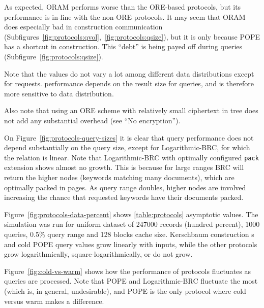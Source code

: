 			As expected, ORAM performs worse than the ORE-based protocols, but its performance is in-line with the non-ORE protocols.
			It may seem that ORAM does especially bad in construction communication (Subfigures~\ref{fig:protocols:qvol},~\ref{fig:protocols:qsize}), but it is only because POPE has a shortcut in construction.
			This ``debt'' is being payed off during queries (Subfigure~\ref{fig:protocols:qsize}).

			Note that the values do not vary a lot among different data distributions except for {\IO} requests.
			{\IO} performance depends on the result size for queries, and is therefore more sensitive to data distribution.

			Also note that using an ORE scheme with relatively small ciphertext in {\BPlus} tree does not add any substantial {\IO} overhead (see ``No encryption'').

			On Figure~\ref{fig:protocols-query-sizes} it is clear that query performance does not depend substantially on the query size, except for Logarithmic\hyp{}BRC, for which the relation is linear.
			Note that Logarithmic\hyp{}BRC with optimally configured \texttt{pack} extension shows almost no growth.
			This is because for large ranges BRC will return the higher nodes (keywords matching many documents), which are optimally packed in {\IO} pages.
			As query range doubles, higher nodes are involved increasing the chance that requested keywords have their documents packed.

			

			Figure~\ref{fig:protocols-data-percent} shows \cref{table:protocols} asymptotic values.
			The simulation was run for uniform dataset of 247000 records (hundred percent), 1000 queries, 0.5\% query range and 128 blocks cache size.
			Kerschbaum construction {\IO}s and cold POPE query values grow linearly with inputs, while the other protocols grow logarithmically, square-logarithmically, or do not grow.

			Figure~\ref{fig:cold-vs-warm} shows how the performance of protocols fluctuates as queries are processed.
			Note that POPE and Logarithmic\hyp{}BRC fluctuate the most (which is, in general, undesirable), and POPE is the only protocol where cold versus warm makes a difference.
